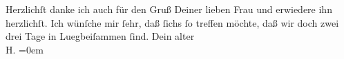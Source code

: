\begin{ledgroupsized}[t]{13cm}
           \pstart
           {\pb}Herzlichſt danke ich auch für den Gruß Deiner
               lieben Frau und erwiedere ihn
               herzlichſt.\pend
           \pstart
           Ich wünſche mir ſehr, daß ſichs ſo treffen möchte, daß wir doch zwei drei Tage in Lueg\label{LL287-4v}beiſammen ſind\label{LL287-4h}.\pend
           \pstart
           Dein alter{\\[\baselineskip]}\spacefill\mbox{H.}\pend
           \leftskip=0em{}
         
         \endnumbering{}\end{ledgroupsized}  \newcommand{\dateiname}{L01478}\newcommand{\titel}{Hermann Bahr an Arthur Schnitzler, 14. 12. 1904}\newcommand{\editorInnen}{ Kurt Ifkovits,  Martin Anton Müller}
      